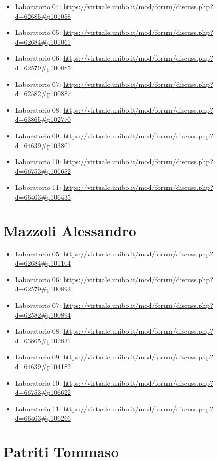 \documentclass[a4paper,12pt]{report}
\begin{document}
\begin{itemize}
 \item Laboratorio 04: \url{https://virtuale.unibo.it/mod/forum/discuss.php?d=62685#p101058}
 \item Laboratorio 05: \url{https://virtuale.unibo.it/mod/forum/discuss.php?d=62684#p101061}
 \item Laboratorio 06: \url{https://virtuale.unibo.it/mod/forum/discuss.php?d=62579#p100885}
 \item Laboratorio 07: \url{https://virtuale.unibo.it/mod/forum/discuss.php?d=62582#p100887}
 \item Laboratorio 08: \url{https://virtuale.unibo.it/mod/forum/discuss.php?d=63865#p102770}
 \item Laboratorio 09: \url{https://virtuale.unibo.it/mod/forum/discuss.php?d=64639#p103801}
 \item Laboratorio 10: \url{https://virtuale.unibo.it/mod/forum/discuss.php?d=66753#p106682}
 \item Laboratorio 11: \url{https://virtuale.unibo.it/mod/forum/discuss.php?d=66463#p106435}
\end{itemize}

\section{Mazzoli Alessandro}

\begin{itemize}
 \item Laboratorio 05: \url{https://virtuale.unibo.it/mod/forum/discuss.php?d=62684#p101104}
 \item Laboratorio 06: \url{https://virtuale.unibo.it/mod/forum/discuss.php?d=62579#p100892}
 \item Laboratorio 07: \url{https://virtuale.unibo.it/mod/forum/discuss.php?d=62582#p100894}
 \item Laboratorio 08: \url{https://virtuale.unibo.it/mod/forum/discuss.php?d=63865#p102831}
 \item Laboratorio 09: \url{https://virtuale.unibo.it/mod/forum/discuss.php?d=64639#p104182}
 \item Laboratorio 10: \url{https://virtuale.unibo.it/mod/forum/discuss.php?d=66753#p106622}
 \item Laboratorio 11: \url{https://virtuale.unibo.it/mod/forum/discuss.php?d=66463#p106266}
\end{itemize}



\section{Patriti Tommaso}
\end{document}
